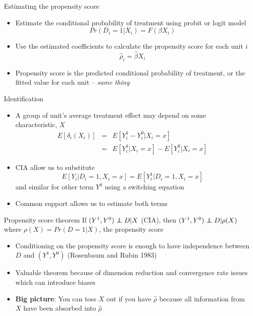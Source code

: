 \documentclass{beamer}
\newcommand\independent{\protect\mathpalette{\protect\independenT}{\perp}}
\def\independenT#1#2{\mathrel{\rlap{$#1#2$}\mkern2mu{#1#2}}}
\begin{document}
\begin{frame}{Estimating the propensity score}

		\begin{itemize}
		\item Estimate the conditional probability of treatment using probit or logit model$$Pr(D_i=1|X_i) = F(\beta X_i)$$
		\item Use the estimated coefficients to calculate the propensity score for each unit $i$$$\widehat{\rho}_i = \widehat{\beta} X_i$$
		\item Propensity score is the predicted conditional probability of treatment, or the fitted value for each unit -- \emph{same thing}
		\end{itemize}
\end{frame}

\begin{frame}{Identification}
	
	\begin{itemize}
	\item A group of unit's average treatment effect may depend on some characteristic, $X$
		\begin{eqnarray*}
		E[\delta_i(X_i) ]&=& E[Y^1_i - Y^0_i | X_i=x] \\
		&=&E[Y^1_i | X_i=x] - E[Y^0_i | X_i=x]
		\end{eqnarray*}
	\item CIA allow us to substitute $$E[Y_i | D_i =1, X_i=x]=E[Y_i^1 | D_i=1, X_i=x]$$ and similar for other term $Y^0$ using a switching equation
	\item Common support allows us to estimate both terms
	\end{itemize}
\end{frame}		


\begin{frame}[plain]
	
	\begin{block}{Propensity score theorem}
	If $(Y^1,Y^0)\independent{D}|X$ (CIA), then $(Y^1,Y^0)\independent{D} | \rho(X)$ where $\rho(X)=Pr(D=1|X)$, the propensity score
	\end{block}
	
	\begin{itemize}
	\item Conditioning on the propensity score is enough to have independence between $D$ and $(Y^1,Y^0)$ (Rosenbaum and Rubin 1983)\\
	 \item Valuable theorem because of dimension reduction and convergence rate issues which can introduce biases
	\item \textbf{Big picture}: You can toss $X$ out if you have $\widehat{\rho}$ because all information from $X$ have been absorbed into $\widehat{\rho}$
	\end{itemize}
\end{frame}
\end{document}
